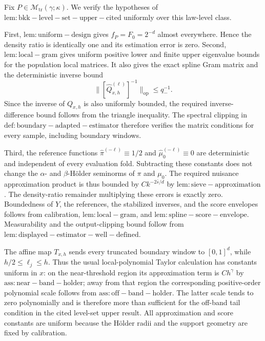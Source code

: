 Fix \(P\in\mathcal M_{\mathrm{tr}}(\gamma;\kappa)\). We verify the hypotheses of \(\mathrm{lem:bkk-level-set-upper-cited}\) uniformly over this law-level class.

First, \(\mathrm{lem:uniform-design}\) gives \(f_P=F_0=2^{-d}\) almost everywhere. Hence the density ratio is identically one and its estimation error is zero. Second, \(\mathrm{lem:local-gram}\) gives uniform positive lower and finite upper eigenvalue bounds for the population local matrices. It also gives the exact spline Gram matrix and the deterministic inverse bound
\[
 \|[\widehat Q^{(\ell)}_{x,h}]^{-1}\|_{\mathrm{op}}\le q_-^{-1}.
\]
Since the inverse of \(Q_{x,h}\) is also uniformly bounded, the required inverse-difference bound follows from the triangle inequality. The spectral clipping in \(\mathrm{def:boundary-adapted-estimator}\) therefore verifies the matrix conditions for every sample, including boundary windows.

Third, the reference functions \(\widehat\pi^{(-\ell)}\equiv1/2\) and \(\widehat\mu_0^{(-\ell)}\equiv0\) are deterministic and independent of every evaluation fold. Subtracting these constants does not change the \(\alpha\)- and \(\beta\)-Hölder seminorms of \(\pi\) and \(\mu_0\). The required nuisance approximation product is thus bounded by \(Ck^{-2\bar s/d}\) by \(\mathrm{lem:sieve-approximation}\). The density-ratio remainder multiplying these errors is exactly zero. Boundedness of \(Y\), the references, the stabilized inverses, and the score envelopes follows from calibration, \(\mathrm{lem:local-gram}\), and \(\mathrm{lem:spline-score-envelope}\). Measurability and the output-clipping bound follow from \(\mathrm{lem:displayed-estimator-well-defined}\).

The affine map \(T_{x,h}\) sends every truncated boundary window to \([0,1]^d\), while \(h/2\le\ell_j\le h\). Thus the usual local-polynomial Taylor calculation has constants uniform in \(x\): on the near-threshold region its approximation term is \(Ch^\gamma\) by \(\mathrm{ass:near-band-holder}\); away from that region the corresponding positive-order polynomial scale follows from \(\mathrm{ass:off-band-holder}\). The latter scale tends to zero polynomially and is therefore more than sufficient for the off-band tail condition in the cited level-set upper result. All approximation and score constants are uniform because the Hölder radii and the support geometry are fixed by calibration.

